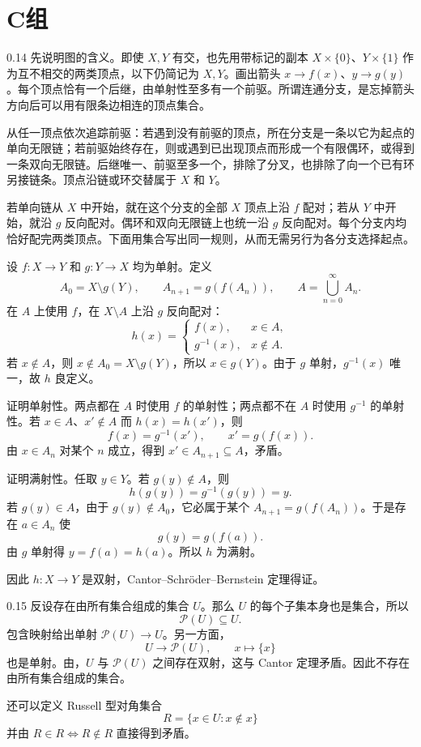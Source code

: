 \section*{C组}

\begin{solution}{0.14}
先说明图的含义。即使 \(X,Y\) 有交，也先用带标记的副本 \(X\times\{0\}\)、\(Y\times\{1\}\) 作为互不相交的两类顶点，以下仍简记为 \(X,Y\)。画出箭头 \(x\to f(x)\)、\(y\to g(y)\)。每个顶点恰有一个后继，由单射性至多有一个前驱。所谓连通分支，是忘掉箭头方向后可以用有限条边相连的顶点集合。

从任一顶点依次追踪前驱：若遇到没有前驱的顶点，所在分支是一条以它为起点的单向无限链；若前驱始终存在，则或遇到已出现顶点而形成一个有限偶环，或得到一条双向无限链。后继唯一、前驱至多一个，排除了分叉，也排除了向一个已有环另接链条。顶点沿链或环交替属于 \(X\) 和 \(Y\)。

若单向链从 \(X\) 中开始，就在这个分支的全部 \(X\) 顶点上沿 \(f\) 配对；若从 \(Y\) 中开始，就沿 \(g\) 反向配对。偶环和双向无限链上也统一沿 \(g\) 反向配对。每个分支内均恰好配完两类顶点。下面用集合写出同一规则，从而无需另行为各分支选择起点。

设 \(f:X\to Y\) 和 \(g:Y\to X\) 均为单射。定义
\[
  A_0=X\setminus g(Y),\qquad
  A_{n+1}=g(f(A_n)),\qquad
  A=\bigcup_{n=0}^{\infty}A_n.
\]
在 \(A\) 上使用 \(f\)，在 \(X\setminus A\) 上沿 \(g\) 反向配对：
\[
  h(x)=
  \begin{cases}
    f(x),&x\in A,\\
    g^{-1}(x),&x\notin A.
  \end{cases}
\]
若 \(x\notin A\)，则 \(x\notin A_0=X\setminus g(Y)\)，所以 \(x\in g(Y)\)。由于 \(g\) 单射，\(g^{-1}(x)\) 唯一，故 \(h\) 良定义。

证明单射性。两点都在 \(A\) 时使用 \(f\) 的单射性；两点都不在 \(A\) 时使用 \(g^{-1}\) 的单射性。若 \(x\in A\)、\(x'\notin A\) 而 \(h(x)=h(x')\)，则
\[
  f(x)=g^{-1}(x'),\qquad x'=g(f(x)).
\]
由 \(x\in A_n\) 对某个 \(n\) 成立，得到 \(x'\in A_{n+1}\subseteq A\)，矛盾。

证明满射性。任取 \(y\in Y\)。若 \(g(y)\notin A\)，则
\[
  h(g(y))=g^{-1}(g(y))=y.
\]
若 \(g(y)\in A\)，由于 \(g(y)\notin A_0\)，它必属于某个 \(A_{n+1}=g(f(A_n))\)。于是存在 \(a\in A_n\) 使
\[
  g(y)=g(f(a)).
\]
由 \(g\) 单射得 \(y=f(a)=h(a)\)。所以 \(h\) 为满射。

因此 \(h:X\to Y\) 是双射，Cantor--Schröder--Bernstein 定理得证。
\end{solution}

\begin{solution}{0.15}
反设存在由所有集合组成的集合 \(U\)。那么 \(U\) 的每个子集本身也是集合，所以
\[
  \mathcal P(U)\subseteq U.
\]
包含映射给出单射 \(\mathcal P(U)\to U\)。另一方面，
\[
  U\longrightarrow\mathcal P(U),\qquad x\longmapsto\{x\}
\]
也是单射。由，\(U\) 与 \(\mathcal P(U)\) 之间存在双射，这与 Cantor 定理矛盾。因此不存在由所有集合组成的集合。

还可以定义 Russell 型对角集合
\[
  R=\{x\in U:x\notin x\}
\]
并由 \(R\in R\Leftrightarrow R\notin R\) 直接得到矛盾。
\end{solution}

